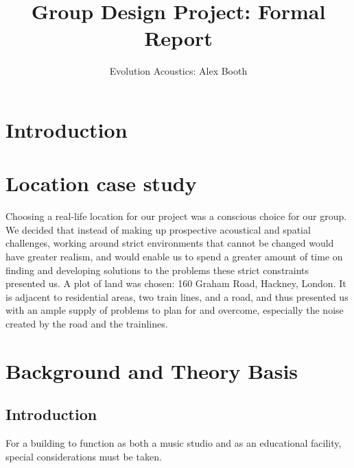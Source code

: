 \documentclass[10pt, twocolumn]{article}
\title{Group Design Project: Formal Report}
\author{Evolution Acoustics: Alex Booth}
\begin{document}
    \maketitle

    \section{Introduction}

    \section{Location case study}
        Choosing a real-life location for our project was a conscious choice for our group.
        We decided that instead of making up prospective acoustical and spatial challenges, working around strict environments that cannot be changed would have greater realism, and would enable us to spend a greater amount of time on finding and developing solutions to the problems these strict constraints presented us.
        A plot of land was chosen: 160 Graham Road, Hackney, London.
        It is adjacent to residential areas, two train lines, and a road, and thus presented us with an ample supply of problems to plan for and overcome, especially the noise created by the road and the trainlines.
        
    \section{Background and Theory Basis}
        \subsection{Introduction}
            For a building to function as both a music studio and as an educational facility, special considerations must be taken.
\end{document}
